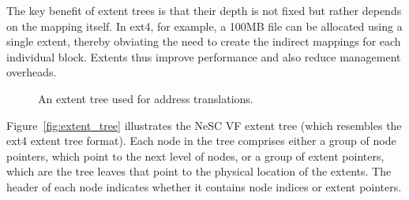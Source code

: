 The key benefit of extent trees is that their depth is not fixed but rather depends on the mapping itself. In ext4, for example, a 100MB file can be allocated using a single extent, thereby obviating the need to create the indirect mappings for each individual block. Extents thus improve performance and also reduce management overheads.

\begin{figure}[t]
  \centering

      \caption{An extent tree used for address translations.\label{fig:extent}}

\end{figure}

Figure~\ref{fig:extent_tree} illustrates the NeSC VF extent tree (which resembles the ext4 extent tree format). Each node in the tree comprises either a group of node pointers, which point to the next level of nodes, or a group of extent pointers, which are the tree leaves that point to the physical location of the extents. The header of each node indicates whether it contains node indices or extent pointers.


